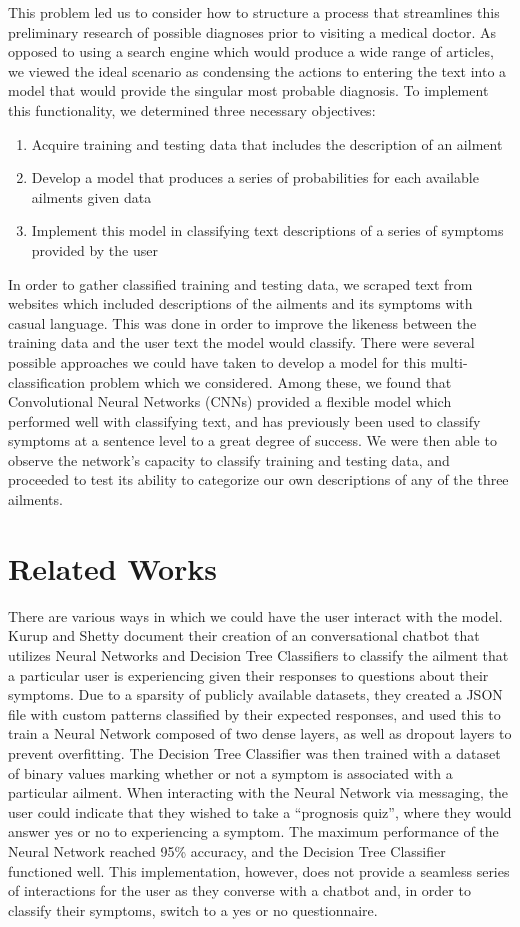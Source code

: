 \documentclass[12pt]{report}
\begin{document}
This problem led us to consider how to structure a process that streamlines
this preliminary research of possible diagnoses prior to visiting a medical
doctor. As opposed to using a search engine which would produce a wide range of
articles, we viewed the ideal scenario as condensing the actions to entering
the text into a model that would provide the singular most probable diagnosis.
To implement this functionality, we determined three necessary objectives:
\begin{enumerate}
	\item Acquire training and testing data that includes the description of an ailment
	\item Develop a model that produces a series of probabilities for each available ailments given data
	\item Implement this model in classifying text descriptions of a series of symptoms provided by the user
\end{enumerate}

In order to gather classified training and testing data, we scraped text from
websites which included descriptions of the ailments and its symptoms with
casual language. This was done in order to improve the likeness between the
training data and the user text the model would classify. There were several
possible approaches we could have taken to develop a model for this
multi-classification problem which we considered. Among these, we found that
Convolutional Neural Networks (CNNs) provided a flexible model which performed
well with classifying text, and has previously been used to classify symptoms
at a sentence level to a great degree of success. We were then able to observe
the network's capacity to classify training and testing data, and proceeded to
test its ability to categorize our own descriptions of any of the three
ailments.

\chapter{Related Works}
There are various ways in which we could have the user interact with the
model. Kurup and Shetty document their creation of an conversational chatbot
that utilizes Neural Networks and Decision Tree Classifiers to classify the
ailment that a particular user is experiencing given their responses to
questions about their symptoms. Due to a sparsity of publicly available
datasets, they created a JSON file with custom patterns classified by their
expected responses, and used this to train a Neural Network composed of two
dense layers, as well as dropout layers to prevent overfitting. The Decision
Tree Classifier was then trained with a dataset of binary values marking
whether or not a symptom is associated with a particular ailment. When
interacting with the Neural Network via messaging, the user could indicate
that they wished to take a “prognosis quiz”, where they would answer yes or
no to experiencing a symptom. The maximum performance of the Neural Network
reached 95\% accuracy, and the Decision Tree Classifier functioned well. This
implementation, however, does not provide a seamless series of interactions
for the user as they converse with a chatbot and, in order to classify their
symptoms, switch to a yes or no questionnaire.
\end{document}
